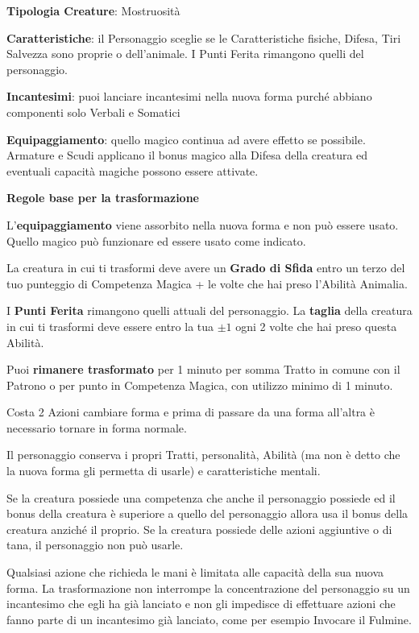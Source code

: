 \begin{multicols}{2}
\textbf{Tipologia Creature}: Mostruosità

\textbf{Caratteristiche}: il Personaggio sceglie se le Caratteristiche fisiche, Difesa, Tiri Salvezza sono proprie o dell'animale. I Punti Ferita rimangono quelli del personaggio.

\textbf{Incantesimi}: puoi lanciare incantesimi nella nuova forma purché abbiano componenti solo Verbali e Somatici

\textbf{Equipaggiamento}: quello magico continua ad avere effetto se possibile. Armature e Scudi applicano il bonus magico alla Difesa della creatura ed eventuali capacità magiche possono essere attivate.

\medskip

\textbf{Regole base per la trasformazione}

\medskip

L'\textbf{equipaggiamento} viene assorbito nella nuova forma e non può essere usato. Quello magico può funzionare ed essere usato come indicato.

La creatura in cui ti trasformi deve avere un \textbf{Grado di Sfida} entro un terzo del tuo punteggio di Competenza Magica + le volte che hai preso l'Abilità Animalia.

I \textbf{Punti Ferita} rimangono quelli attuali del personaggio. La \textbf{taglia} della creatura in cui ti trasformi deve essere entro la tua $\pm 1$ ogni 2 volte che hai preso questa Abilità.

Puoi \textbf{rimanere trasformato} per 1 minuto per somma Tratto in comune con il Patrono  o per punto in Competenza Magica, con utilizzo minimo di 1 minuto.

Costa 2 Azioni cambiare forma e prima di passare da una forma all'altra è necessario tornare in forma normale.

Il personaggio conserva i propri Tratti, personalità, Abilità (ma non è detto che la nuova forma gli permetta di usarle) e caratteristiche mentali.

Se la creatura possiede una competenza che anche il personaggio possiede ed il bonus della creatura è superiore a quello del personaggio allora usa il bonus della creatura anziché il proprio. Se la creatura possiede delle azioni aggiuntive o di tana, il personaggio non può usarle.

Qualsiasi azione che richieda le mani è limitata alle capacità della sua nuova forma. La trasformazione non interrompe la concentrazione del personaggio su un incantesimo che egli ha già lanciato e non gli impedisce di effettuare azioni che fanno parte di un incantesimo già lanciato, come per esempio Invocare il Fulmine.


\end{multicols}
